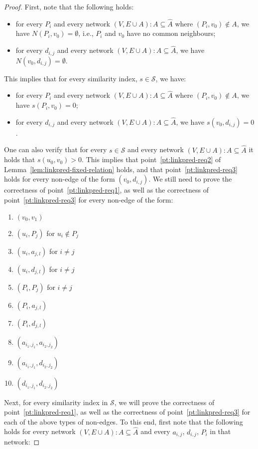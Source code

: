 \documentclass[twocolumn]{article}
\newcommand{\FA}{\widehat{A}}
\begin{document}
\begin{proof}
First, note that the following holds:
\begin{itemize}
\item for every $P_i$ and every network $(V,E\cup A):A\subseteq \FA$ where $(P_i,v_0)\notin A$, we have $ N(P_i,v_0) = \emptyset$, i.e., $P_i$ and $v_0$ have no common neighbours;
\item for every $d_{i,j}$ and every network $(V,E\cup A):A\subseteq \FA$, we have $N(v_0,d_{i,j}) = \emptyset$.
\end{itemize}
This implies that for every similarity index, $s \in \mathcal{S}$, we have:
\begin{itemize}
\item for every $P_i$ and every network $(V,E\cup A):A\subseteq \FA$ where $(P_i,v_0)\notin A$, we have $s(P_i,v_0) = 0$;
\item for every $d_{i,j}$ and every network $(V,E\cup A):A\subseteq \FA$, we have $s(v_0,d_{i,j}) = 0$.
\end{itemize}
\noindent One can also verify that for every $s \in \mathcal{S}$ and every network $(V,E\cup A):A\subseteq \FA$ it holds that $s(u_0,v_0)>0$. This implies that point~\ref{pt:linkpred-req2} of Lemma~\ref{lem:linkpred-fixed-relation} holds, and that point~\ref{pt:linkpred-req3} holds for every non-edge of the form $(v_0,d_{i,j})$.
We still need to prove the correctness of point~\ref{pt:linkpred-req1}, as well as the correctness of point~\ref{pt:linkpred-req3} for every non-edge of the form:

\begin{enumerate}[label=(\roman*)]
\item $(v_0,v_1)$
\item $(u_i,P_j)$ for $u_i \notin P_j$
\item $(u_i,a_{j,l})$ for $i \neq j$
\item $(u_i,d_{j,l})$ for $i \neq j$
\item $(P_i,P_j)$ for $i \neq j$
\item $(P_i,a_{j,l})$
\item $(P_i,d_{j,l})$
\item $(a_{i_1,j_1},a_{i_2,j_2})$
\item $(a_{i_1,j_1},d_{i_2,j_2})$
\item $(d_{i_1,j_1},d_{i_2,j_2})$
\end{enumerate}

\noindent Next, for every similarity index in $\mathcal{S}$, we will prove the correctness of point~\ref{pt:linkpred-req1}, as well as the correctness of point~\ref{pt:linkpred-req3} for each of the above types of non-edges. To this end, first note that the following holds for every network $(V,E\cup A):A\subseteq \FA$ and every $a_{i,j}$, $d_{i,j}$, $P_i$ in that network:


\end{proof}
\end{document}
